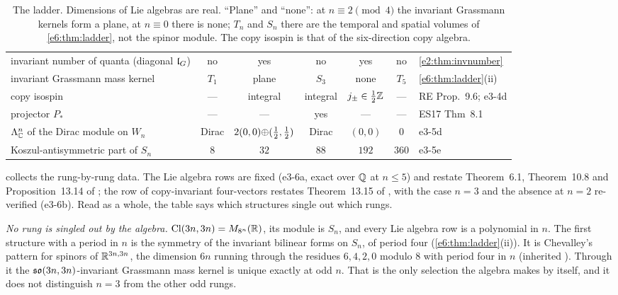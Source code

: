 \begin{table}[t]
\begin{tabular}{@{}>{\raggedright\arraybackslash}p{4.7cm}ccccc>{\raggedright\arraybackslash}p{2.7cm}@{}}
invariant number of quanta (diagonal $\mathfrak l_G$) & no & yes & no & yes & no & \cref{e2:thm:invnumber}\\
invariant Grassmann mass kernel & $T_1$ & plane & $S_3$ & none & $T_5$ & \cref{e6:thm:ladder}(ii)\\
copy isospin & --- & integral & integral & $j_\pm\in\tfrac12\mathbb{Z}$ & --- & RE Prop.~9.6; e3-4d\\
projector $P_*$ & --- & --- & yes & --- & --- & ES17 Thm~8.1\\
$\Lambda^n_{\mathbb{C}}$ of the Dirac module on $W_n$ & Dirac & $2(0,0){\oplus}(\tfrac12,\tfrac12)$ & Dirac & $(0,0)$ & $0$ & e3-5d\\
Koszul-antisymmetric part of $S_n$ & $8$ & $32$ & $88$ & $192$ & $360$ & e3-5e\\
\bottomrule
\end{tabular}
\caption{The ladder. Dimensions of Lie algebras are real. ``Plane'' and ``none'': at $n\equiv2\pmod4$ the invariant Grassmann kernels form a plane,
at $n\equiv0$ there is none; $T_n$ and $S_n$ there are the temporal and spatial volumes of \cref{e6:thm:ladder}, not the spinor module. The copy
isospin is that of the six-direction copy algebra.}
\label{e3:tab:ladder}
\end{table}

 collects the rung-by-rung data. The Lie algebra rows are fixed (e3-6a, exact over $\mathbb{Q}$ at $n\le5$) and restate
Theorem~6.1, Theorem~10.8 and Proposition~13.14 of \cite{ES17}; the row of copy-invariant four-vectors restates Theorem~13.15 of \cite{ES17}, with
the case $n=3$ and the absence at $n=2$ re-verified (e3-6b). Read as a whole, the table says which structures single out which rungs.

\emph{No rung is singled out by the algebra.} $\mathrm{Cl}(3n,3n)=M_{8^n}(\mathbb{R})$, its module is $S_n$, and every Lie algebra row is a polynomial in $n$. The
first structure with a period in $n$ is the symmetry of the invariant bilinear forms on $S_n$, of period four (\cref{e6:thm:ladder}(ii)). It is
Chevalley's pattern for spinors of $\mathbb{R}^{3n,3n}$, the dimension $6n$ running through the residues $6,4,2,0$ modulo $8$ with period four in $n$
(inherited \cite{Chevalley54}). Through it the $\mathfrak{so}(3n,3n)$-invariant Grassmann mass kernel is unique exactly at odd $n$. That is the only
selection the algebra makes by itself, and it does not distinguish $n=3$ from the other odd rungs.

